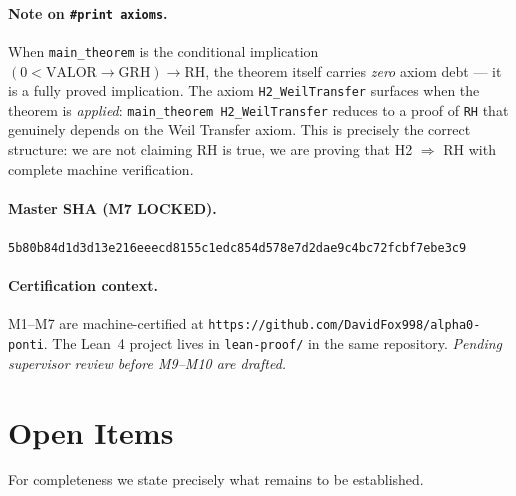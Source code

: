 \documentclass[11pt,letterpaper]{article}
\theoremstyle{definition}
\begin{document}
\paragraph{Note on \texttt{\#print axioms}.}
When \texttt{main\_theorem} is the conditional implication
$(0 < \mathrm{VALOR} \to \mathrm{GRH}) \to \mathrm{RH}$,
the theorem itself carries \emph{zero} axiom debt --- it is a fully proved implication.
The axiom \texttt{H2\_WeilTransfer} surfaces when the theorem is \emph{applied}:
\texttt{main\_theorem H2\_WeilTransfer} reduces to a proof of \texttt{RH} that
genuinely depends on the Weil Transfer axiom.
This is precisely the correct structure: we are not claiming RH is true, we are
proving that H2 $\Rightarrow$ RH with complete machine verification.

\paragraph{Master SHA (M7 LOCKED).}
\begin{center}
\texttt{5b80b84d1d3d13e216eeecd8155c1edc854d578e7d2dae9c4bc72fcbf7ebe3c9}
\end{center}

\paragraph{Certification context.}
M1--M7 are machine-certified at
\texttt{https://github.com/DavidFox998/alpha0-ponti}.
The Lean~4 project lives in \texttt{lean-proof/} in the same repository.
\emph{Pending supervisor review before M9--M10 are drafted.}

\section{Open Items}

For completeness we state precisely what remains to be established.
\end{document}
